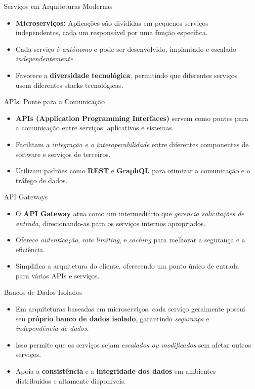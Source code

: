 \begin{frame}{Serviços em Arquiteturas Modernas}
  \begin{itemize}
    \item \textbf{Microserviços:} Aplicações são divididas em pequenos serviços independentes, cada um responsável por uma função específica.
    \item Cada serviço é \textit{autônomo} e pode ser desenvolvido, implantado e escalado \textit{independentemente}.
    \item Favorece a \textbf{diversidade tecnológica}, permitindo que diferentes serviços usem diferentes stacks tecnológicas.
  \end{itemize}
\end{frame}

\begin{frame}{APIs: Ponte para a Comunicação}
  \begin{itemize}
    \item \textbf{APIs (Application Programming Interfaces)} servem como pontes para a comunicação entre serviços, aplicativos e sistemas.
    \item Facilitam a \textit{integração e a interoperabilidade} entre diferentes componentes de software e serviços de terceiros.
    \item Utilizam padrões como \textbf{REST} e \textbf{GraphQL} para otimizar a comunicação e o tráfego de dados.
  \end{itemize}
\end{frame}

\begin{frame}{API Gateways}
  \begin{itemize}
    \item O \textbf{API Gateway} atua como um intermediário que \textit{gerencia solicitações de entrada}, direcionando-as para os serviços internos apropriados.
    \item Oferece \textit{autenticação}, \textit{rate limiting}, e \textit{caching} para melhorar a segurança e a eficiência.
    \item Simplifica a arquitetura do cliente, oferecendo um ponto único de entrada para várias APIs e serviços.
  \end{itemize}
\end{frame}

\begin{frame}{Bancos de Dados Isolados}
  \begin{itemize}
    \item Em arquiteturas baseadas em microserviços, cada serviço geralmente possui seu \textbf{próprio banco de dados isolado}, garantindo \textit{segurança} e \textit{independência de dados}.
    \item Isso permite que os serviços sejam \textit{escalados ou modificados} sem afetar outros serviços.
    \item Apoia a \textbf{consistência} e a \textbf{integridade dos dados} em ambientes distribuídos e altamente disponíveis.
  \end{itemize}
\end{frame}

